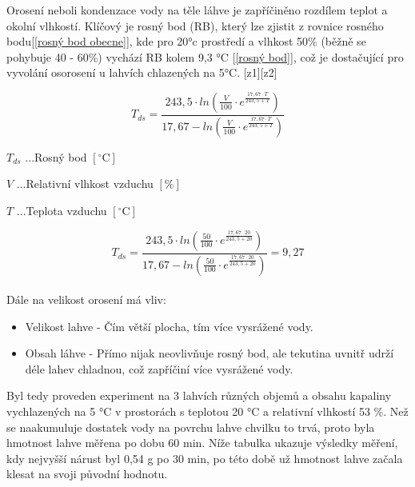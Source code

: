 Orosení neboli kondenzace vody na těle láhve je zapříčiněno rozdílem teplot a okolní vlhkostí. Klíčový je rosný bod (RB), který lze zjistit z rovnice rosného bodu[\ref{rosný bod obecne}], kde pro 20°c prostředí a vlhkost 50\% (běžně se pohybuje 40 - 60\%) vychází RB kolem 9,3 °C [\ref{rosný bod}], což je dostačující pro vyvolání osorosení u lahvích chlazených na 5°C. [z1][z2]

\begin{equation}
T_{ds} = \frac{243,5 \cdot ln(\frac{V}{100} \cdot e^{\frac{17,67 \cdot T}{243,5 + T}})}{17,67 - ln(\frac{V}{100} \cdot e^{\frac{17,67 \cdot T}{243,5 + T}})}
\label{rosný bod obecne}
\end{equation}

\(T_{ds}\) ...Rosný bod \([\mathrm{^\circ C}]\)

\(V\) ...Relativní vlhkost vzduchu \([\mathrm{\%}]\)

\(T\) ...Teplota vzduchu \([\mathrm{^\circ C}]\)

\begin{equation}
T_{ds} = \frac{243,5 \cdot ln(\frac{50}{100} \cdot e^{\frac{17,67 \cdot 20}{243,5 + 20}})}{17,67 - ln(\frac{50}{100} \cdot e^{\frac{17,67 \cdot 20}{243,5 + 20}})} = 9,27
\label{rosný bod}
\end{equation}
\\
Dále na velikost orosení má vliv:
\begin{itemize}
    \item Velikost lahve - Čím větší plocha, tím více vysrážené vody.
    \item Obsah láhve - Přímo nijak neovlivňuje rosný bod, ale tekutina uvnitř udrží déle lahev chladnou, což zapříčiní více vysrážené vody.
\end{itemize}

Byl tedy proveden experiment na 3 lahvích různých objemů a obsahu kapaliny vychlazených na 5 °C v prostorách s teplotou 20 °C a relativní vlhkostí 53 \%. Než se naakumuluje dostatek vody na povrchu lahve chvilku to trvá, proto byla hmotnost lahve měřena po dobu 60 min. Níže tabulka ukazuje výsledky měření, kdy nejvyšší nárust byl 0,54 g po 30 min, po této době už hmotnost lahve začala klesat na svoji původní hodnotu.


